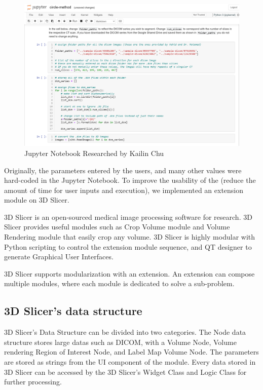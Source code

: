 \begin{figure}[H]
    \centering
    \includegraphics[width=\textwidth]{figures/AGR/jupyter_research.png}
    \caption[Jupyter Notebook Research]{Jupyter Notebook Researched by Kailin Chu}
    \label{fig_jnr}
\end{figure}

Originally, the parameters entered by the users, and many other values were hard-coded in the Jupyter Notebook. To improve the usability of the \progname{} (reduce the amount of time for user inputs and execution), we implemented an extension module on 3D Slicer. 

3D Slicer is an open-sourced medical image processing software for research. 3D Slicer provides useful modules such as Crop Volume module and Volume Rendering module that easily crop any volume. 3D Slicer is highly modular with Python scripting to control the extension module sequence, and QT designer to generate Graphical User Interfaces.

3D Slicer supports modularization with an extension. An extension can compose multiple modules, where each module is dedicated to solve a sub-problem.

\subsection{3D Slicer's data structure}

3D Slicer's Data Structure can be divided into two categories. The Node data structure stores large datas such as DICOM, with a Volume Node, Volume rendering Region of Interest Node, and Label Map Volume Node. The parameters are stored as strings from the UI component of the module. Every data stored in 3D Slicer can be accessed by the 3D Slicer's Widget Class and Logic Class for further processing. 

